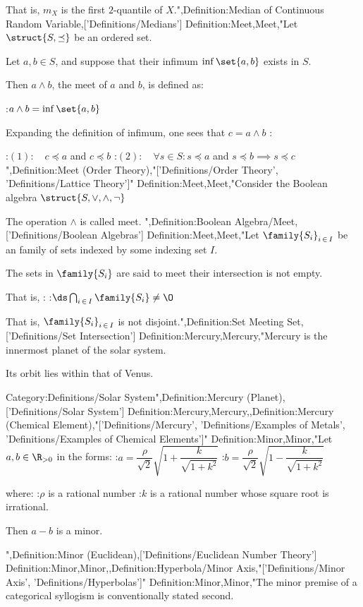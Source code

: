 That is, $m_X$ is the first $2$-quantile of $X$.",Definition:Median of Continuous Random Variable,['Definitions/Medians']
Definition:Meet,Meet,"Let $\struct {S, \preceq}$ be an ordered set.

Let $a, b \in S$, and suppose that their infimum $\inf \set {a, b}$ exists in $S$.


Then $a \wedge b$, the meet of $a$ and $b$, is defined as:

:$a \wedge b = \inf \set {a, b}$


Expanding the definition of infimum, one sees that $c = a \wedge b$ :

:$(1): \quad c \preceq a$ and $c \preceq b$
:$(2): \quad \forall s \in S: s \preceq a$ and $s \preceq b \implies s \preceq c$",Definition:Meet (Order Theory),"['Definitions/Order Theory', 'Definitions/Lattice Theory']"
Definition:Meet,Meet,"Consider the Boolean algebra $\struct {S, \vee, \wedge, \neg}$


The operation $\wedge$ is called meet.
",Definition:Boolean Algebra/Meet,['Definitions/Boolean Algebras']
Definition:Meet,Meet,"Let $\family {S_i}_{i \mathop \in I}$ be an family of sets indexed by some  indexing set $I$.

The sets in $\family {S_i}$ are said to meet  their intersection is not empty.


That is, :
:$\ds \bigcap_{i \mathop \in I} \family {S_i} \ne \O$


That is,  $\family {S_i}_{i \mathop \in I}$ is not disjoint.",Definition:Set Meeting Set,['Definitions/Set Intersection']
Definition:Mercury,Mercury,"Mercury is the innermost planet of the solar system.

Its orbit lies within that of Venus.

Category:Definitions/Solar System",Definition:Mercury (Planet),['Definitions/Solar System']
Definition:Mercury,Mercury,,Definition:Mercury (Chemical Element),"['Definitions/Mercury', 'Definitions/Examples of Metals', 'Definitions/Examples of Chemical Elements']"
Definition:Minor,Minor,"Let $a, b \in \R_{>0}$ in the forms:
:$a = \dfrac \rho {\sqrt 2} \sqrt {1 + \dfrac k {\sqrt {1 + k^2} } }$
:$b = \dfrac \rho {\sqrt 2} \sqrt {1 - \dfrac k {\sqrt {1 + k^2} } }$

where:
:$\rho$ is a rational number
:$k$ is a rational number whose square root is irrational.


Then $a - b$ is a minor.


",Definition:Minor (Euclidean),['Definitions/Euclidean Number Theory']
Definition:Minor,Minor,,Definition:Hyperbola/Minor Axis,"['Definitions/Minor Axis', 'Definitions/Hyperbolas']"
Definition:Minor,Minor,"The minor premise of a categorical syllogism is conventionally stated second.


